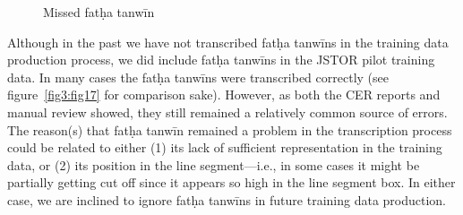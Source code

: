 \begin{figure}[!ht]
	\caption{Missed fatḥa tanwīn}
  	\label{fig3:fig16}
\end{figure}
 
Although in the past we have not transcribed fatḥa tanwīns in the training data
production process, we did include fatḥa tanwīns in the JSTOR pilot training
data. In many cases the fatḥa tanwīns were transcribed correctly (see
figure~\ref{fig3:fig17} for comparison sake). However, as both the CER reports
and manual review showed, they still remained a relatively common source of
errors.  The reason(s) that fatḥa tanwīn remained a problem in the
transcription process could be related to either (1) its lack of sufficient
representation in the training data, or (2) its position in the line
segment—i.e., in some cases it might be partially getting cut off since it
appears so high in the line segment box. In either case, we are inclined to
ignore fatḥa tanwīns in future training data production. 

